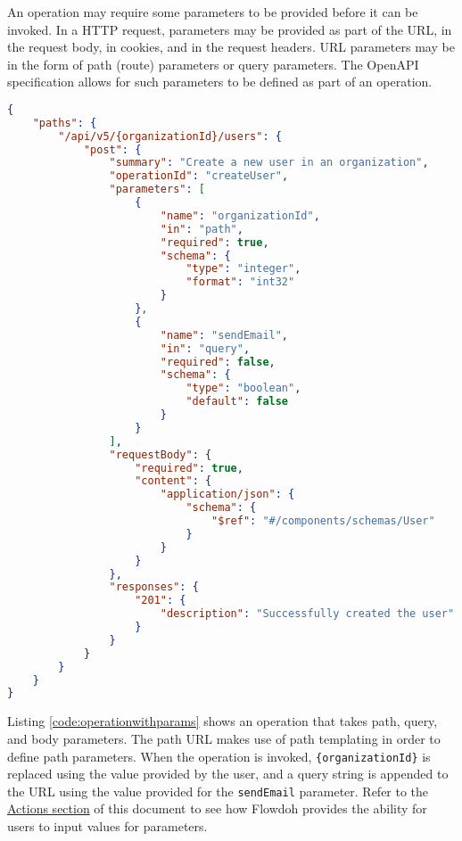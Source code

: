 An operation may require some parameters to be provided before it can be invoked. In a HTTP request, parameters may be provided as part of the URL, in the request body, in cookies, and in the request headers. URL parameters may be in the form of path (route) parameters or query parameters. The OpenAPI specification allows for such parameters to be defined as part of an operation.
\begin{minipage}{\textwidth}
\begin{lstlisting}[caption={A \texttt{POST} request with parameters},label={code:operationwithparams},language=json]
{
    "paths": {
        "/api/v5/{organizationId}/users": {
            "post": {
                "summary": "Create a new user in an organization",
                "operationId": "createUser",
                "parameters": [
                    {
                        "name": "organizationId",
                        "in": "path",
                        "required": true,
                        "schema": {
                            "type": "integer",
                            "format": "int32"
                        }
                    },
                    {
                        "name": "sendEmail",
                        "in": "query",
                        "required": false,
                        "schema": {
                            "type": "boolean",
                            "default": false
                        }
                    }
                ],
                "requestBody": {
                    "required": true,
                    "content": {
                        "application/json": {
                            "schema": {
                                "$ref": "#/components/schemas/User"
                            }
                        }
                    }
                },
                "responses": {
                    "201": {
                        "description": "Successfully created the user"
                    }
                }
            }
        }
    }
}
\end{lstlisting}
\end{minipage}
Listing \ref{code:operationwithparams} shows an operation that takes path, query, and body parameters. The path URL makes use of path templating in order to define path parameters. When the operation is invoked, \texttt{\{organizationId\}} is replaced using the value provided by the user, and a query string is appended to the URL using the value provided for the \texttt{sendEmail} parameter. Refer to the \hyperref[sec:actions]{Actions section} of this document to see how Flowdoh provides the ability for users to input values for parameters.

